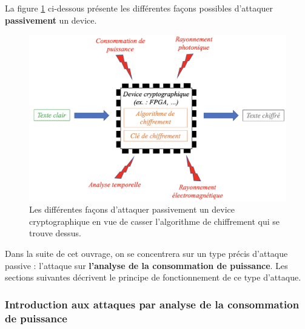 \documentclass[10pt, oneside, a4paper]{article}
\begin{document}
\hspace{-0.5 cm}La figure \ref{fig:attackpassive} ci-dessous présente les différentes façons possibles d'attaquer \textbf{passivement} un device.
\begin{figure}[htbp]
    \centering
    \includegraphics[scale=0.4]{image/attackpassive}
    \caption{Les différentes façons d'attaquer passivement un device cryptographique en vue de casser l'algorithme de chiffrement qui se trouve dessus.}
    \label{fig:attackpassive}
\end{figure}

Dans la suite de cet ouvrage, on se concentrera sur un type précis d'attaque passive : l'attaque sur \textbf{l'analyse de la consommation de puissance}. Les sections suivantes décrivent le principe de fonctionnement de ce type d'attaque. 

\subsubsection{Introduction aux attaques par analyse de la consommation de puissance}
\label{subsec:CPAIntroduc}
\end{document}
